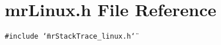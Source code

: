 \section{mr\-Linux.h File Reference}
\label{mrLinux_8h}
{\tt \#include \char`\"{}mr\-Stack\-Trace\_\-linux.h\char`\"{}}\par
